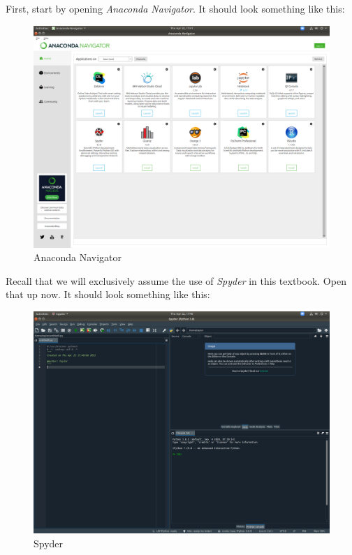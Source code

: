 \documentclass[
  12pt,
  krantz2]{krantz}
\begin{document}
First, start by opening \emph{Anaconda Navigator}. It should look something like this:

\begin{figure}

{\centering \includegraphics[width=0.8\linewidth]{pics/anaconda_navigator} 

}

\caption{Anaconda Navigator}\label{fig:anaconda-navigator}
\end{figure}

Recall that we will exclusively assume the use of \emph{Spyder} in this textbook. Open that up now. It should look something like this:

\begin{figure}

{\centering \includegraphics[width=0.8\linewidth]{pics/spyder_screenshot} 

}

\caption{Spyder}\label{fig:spyder}
\end{figure}
\end{document}
